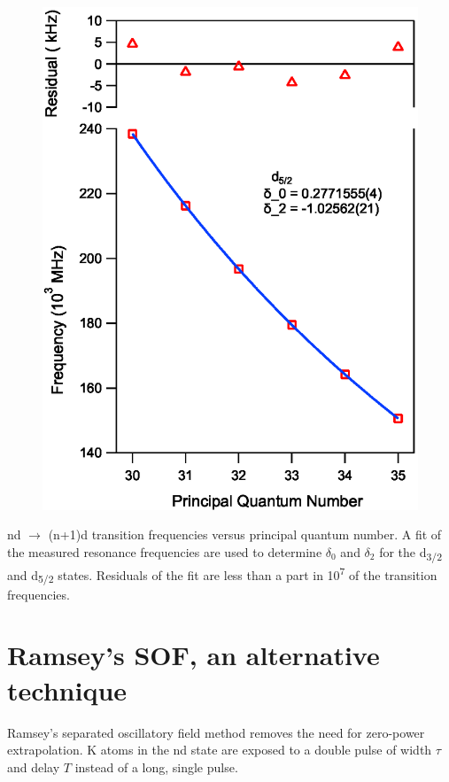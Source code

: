 \documentclass[landscape]{sciposter}
\begin{document}
\begin{multicols}{4}
\begin{figure}
\begin{center}
\includegraphics[scale = 0.9]{d52_qd.eps}
\end{center}
\end{figure}

nd $\rightarrow$ (n+1)d transition frequencies versus principal quantum number. A fit of the measured resonance frequencies are used to determine $\delta_0$ and $\delta_2$ for the d\textsubscript{3/2} and d\textsubscript{5/2} states. Residuals of the fit are less than a part in 10\textsuperscript{7} of the transition frequencies.

\section*{Ramsey's SOF, an alternative technique}
Ramsey's separated oscillatory field method removes the need for zero-power extrapolation. K atoms in the nd state are exposed to a double pulse of width $\tau$ and delay $T$ instead of a long, single pulse. 


\end{multicols}
\end{document}

